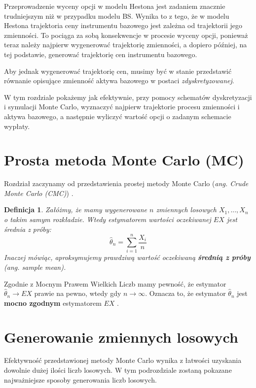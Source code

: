 \documentclass{pracamgr}
\newtheorem{defi}{Definicja}[section]
\begin{document}
Przeprowadzenie wyceny opcji w modelu Hestona jest zadaniem znacznie trudniejszym
niż w przypadku modelu BS. Wynika to z tego, że w modelu Hestona trajektoria 
ceny instrumentu bazowego jest zależna od trajektorii jego zmienności. To pociąga za sobą
konsekwencje w procesie wyceny opcji, ponieważ teraz należy najpierw wygenerować trajektorię
zmienności, a dopiero później, na tej podstawie, generować trajektorię cen instrumentu bazowego.

Aby jednak wygenerować trajektorię cen, musimy być w stanie przedstawić równanie opisujące
zmienność aktywa bazowego w postaci \textit{zdyskretyzowanej}.

W tym rozdziale pokażemy jak efektywnie, przy pomocy schematów dyskretyzacji i symulacji Monte Carlo, 
wyznaczyć najpierw trajektorie procesu zmienności i aktywa bazowego, a następnie wyliczyć wartość
opcji o zadanym schemacie wypłaty.

\section{Prosta metoda Monte Carlo (MC)}
\label{sec:mc}

Rozdział zaczynamy od przedstawienia prostej metody 
Monte Carlo (\textit{ang. Crude Monte Carlo (CMC)}) \cite{Niemiro}.

\begin{defi}
Załóżmy, że mamy wygenerowane $n$ zmiennych losowych $X_1, ..., X_n$ o takim samym rozkładzie. 
Wtedy estymatorem wartości oczekiwanej $EX$ jest średnia z próby:
\begin{equation}
  \hat{\theta}_n = \sum_{i=1}^n \frac{X_i}{n}
\end{equation}
Inaczej mówiąc, aproksymujemy prawdziwą wartość oczekiwaną 
\textbf{średnią z próby} (\textit{ang. sample mean}).
\end{defi}


Zgodnie z Mocnym Prawem Wielkich Liczb mamy pewność, że estymator 
$\hat{\theta}_n \rightarrow EX$ prawie na pewno, wtedy gdy $n \rightarrow \infty$. 
Oznacza to, że estymator $\hat{\theta}_n $ jest \textbf{mocno zgodnym} 
estymatorem $EX$ \cite{Glasserman}.



\section{Generowanie zmiennych losowych}
\label{sec:genRV}

Efektywność przedstawionej metody Monte Carlo wynika z łatwości uzyskania dowolnie dużej
ilości liczb losowych. 
W tym podrozdziale zostaną pokazane najważniejsze sposoby generowania liczb losowych.
\end{document}
